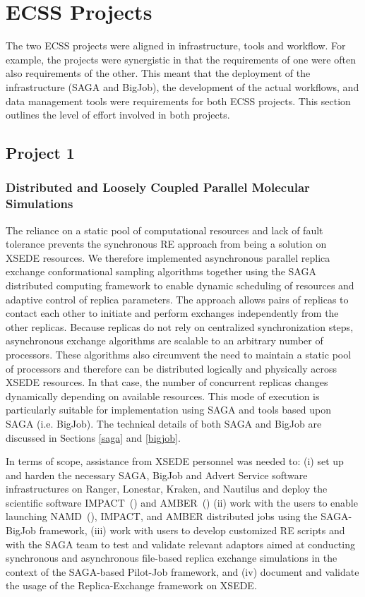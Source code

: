 \documentclass{sig-alternate}
\begin{document}
\section{ECSS Projects}

The two ECSS projects were aligned in infrastructure, tools and
workflow.  For example, the projects were synergistic in that
the requirements of one were often also requirements of the
other. This meant that the deployment of the infrastructure (SAGA and BigJob), 
the development of the actual workflows, and data management tools were
requirements for both ECSS projects. This section outlines the
level of effort involved in both projects.

\subsection{Project 1}
\subsubsection*{Distributed and Loosely Coupled Parallel Molecular Simulations}
The reliance on a static pool of computational resources and lack of
fault tolerance prevents the synchronous RE approach from being a
solution on XSEDE resources. We therefore implemented asynchronous
parallel replica exchange conformational sampling algorithms together
using the SAGA distributed computing framework to enable dynamic
scheduling of resources and adaptive control of replica
parameters. The approach allows pairs of replicas to contact
each other to initiate and perform exchanges independently from the
other replicas. Because replicas do not rely on centralized
synchronization steps, asynchronous exchange algorithms are scalable to an
arbitrary number of processors. These algorithms also circumvent
the need to maintain a static pool of processors and therefore
can be distributed logically and physically across XSEDE resources.
In that case, the number of concurrent replicas changes dynamically
depending on available resources. This mode of execution is particularly
suitable for implementation using SAGA and tools based upon SAGA (i.e. BigJob). The technical details of both SAGA and BigJob are discussed in Sections \ref{saga} and \ref{bigjob}.

In terms of scope, assistance from XSEDE personnel was needed to: (i) set up and
harden the necessary SAGA, BigJob and Advert Service software infrastructures on
Ranger, Lonestar, Kraken, and Nautilus and deploy the scientific software
IMPACT~(\cite{IMPACT}) and AMBER~(\cite{AMBER}) (ii) work with the
users to enable launching NAMD~(\cite{NAMD}), 
IMPACT, and AMBER distributed jobs using the
SAGA-BigJob framework, (iii) work with users to develop customized RE scripts
and with the SAGA team to test and validate relevant adaptors aimed at
conducting synchronous and asynchronous ﬁle-based replica exchange simulations
in the context of the SAGA-based Pilot-Job framework, and (iv)  document and
validate the usage of the Replica-Exchange framework on XSEDE.
\end{document}
